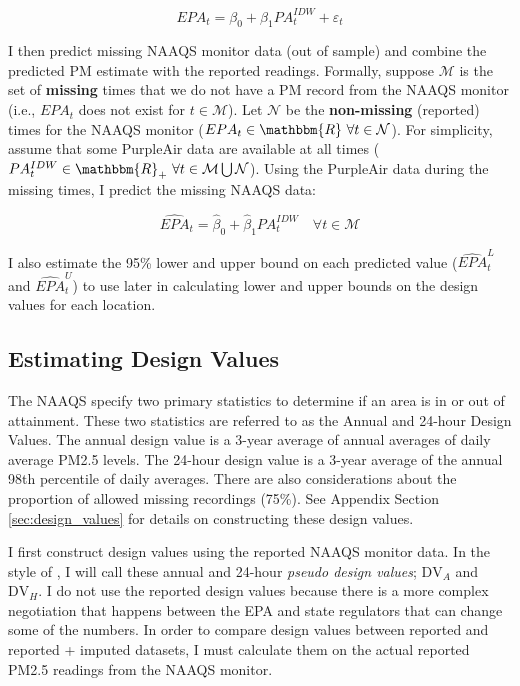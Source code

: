 \documentclass[12pt]{article}
\begin{document}
\begin{equation}
EPA_t = \beta_0 + \beta_1 PA^{IDW}_t + \varepsilon_t
\end{equation}

\def\M{\mathcal{M}}\def\N{\mathcal{N}}\def\R{\mathbbm{R}}
\def\up{\widehat{EPA}^U_t} \def\low{\widehat{EPA}^L_t}
I then predict missing NAAQS monitor data (out of sample) and combine the predicted PM estimate with the reported readings. Formally, suppose $\M$ is the set of \textbf{missing} times that we do not have a PM record from the NAAQS monitor (i.e., $EPA_t$ does not exist for $t\in\M$). Let $\N$ be the \textbf{non-missing} (reported) times for the NAAQS monitor ($EPA_t\in\R\ \forall t\in\N$). For simplicity, assume that some PurpleAir data are available at all times ($PA^{IDW}_t\in\R_+\ \forall t\in\M\bigcup\N$). Using the PurpleAir data during the missing times, I predict the missing NAAQS data:

\begin{equation}
\widehat{EPA}_t = \hat\beta_0 + \hat\beta_1 PA^{IDW}_t \quad \forall t\in\M
\end{equation}

I also estimate the 95\% lower and upper bound on each predicted value ($\low$ and $\up$) to use later in calculating lower and upper bounds on the design values for each location.

\subsection{Estimating Design Values} \label{design_value_equations}
The NAAQS specify two primary statistics to determine if an area is in or out of attainment. These two statistics are referred to as the Annual and 24-hour Design Values. The annual design value is a 3-year average of annual averages of daily average PM2.5 levels. The 24-hour design value is a 3-year average of the annual 98th percentile of daily averages. There are also considerations about the proportion of allowed missing recordings (75\%). See Appendix Section \ref{sec:design_values} for details on constructing these design values.

\def\dva{\text{DV}_A}\def\dvh{\text{DV}_H}
\def\dvaa{\widetilde{\text{DV}}_A}\def\dvhh{\widetilde{\text{DV}_H}}
I first construct design values using the reported NAAQS monitor data. In the style of \cite{fowlieBringingSatelliteBasedAir2019}, I will call these annual and 24-hour \textit{pseudo design values}; $\dva$ and $\dvh$. I do not use the reported design values because there is a more complex negotiation that happens between the EPA and state regulators that can change some of the numbers. In order to compare design values between reported and reported + imputed datasets, I must calculate them on the actual reported PM2.5 readings from the NAAQS monitor.
\end{document}
